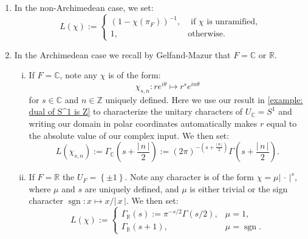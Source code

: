 \documentclass[11pt, x11names]{article}
\newcommand{\zz}{\mathbb{Z}}
\newcommand{\rr}{\mathbb{R}}
\newcommand{\cc}{\mathbb{C}}
\newcommand{\set}[1]{\left\{ #1 \right\}}
\renewcommand{\brack}[1]{\left(   #1 \right)}
\newcommand{\abs}[1]{\left| \, #1  \,\right|}
\DeclareMathOperator{\sgn}{sgn}
\newcommand{\inv}[1]{#1^{-1}}
\begin{document}
\begin{enumerate}[(1)]
    \item In the non-Archimedean case, we set:
    \begin{equation}
        \label{eqn: non-Arch local L-factor}
        L(\chi) := \begin{cases}
            \inv{\brack{1 - \chi(\pi_F)}}, & \text{ if } \chi \text{ is unramified,}\\
            1, & \text{otherwise}.
        \end{cases}
    \end{equation}
    \item In the Archimedean case we recall by Gelfand-Mazur that $F = \cc$ or $\rr$. 
    \begin{enumerate}[(i)]
        \item If $F = \cc$, note any $\chi$ is of the form:
        \begin{equation*}
            \chi_{s, n}: re^{i\theta} \mapsto r^s e^{i n \theta}
        \end{equation*}
         for $s \in \cc$ and $n \in \zz$ uniquely defined. Here we use our result in \ref{example: dual of S^1 is Z} to characterize the unitary characters of $U_\cc = S^1$ and writing our domain in polar coordinates automatically makes $r$ equal to the absolute value of our complex input. We then set:
         \begin{equation}
        \label{eqn: complex local L-factor}
            L(\chi_{s, n}) := \Gamma_\cc(s + \frac{\abs{n}}{2}) := \brack{2 \pi}^{-\brack{s + \frac{\abs{n}}{2}}}\Gamma(s + \frac{\abs{n}}{2}).
         \end{equation} 
         \item If $F = \rr$ the $U_F = \set{\pm 1}$. Note any character is of the form $\chi = \mu \abs{\cdot}^s$, where $\mu$ and $s$ are uniquely defined, and $\mu$ is either trivial or the sign character $\sgn: x \mapsto x/\abs{x}$. We then set:
         \begin{equation}
        \label{eqn: real local L-factor}
             L(\chi) := \begin{cases}
                 \Gamma_\rr(s) := \pi^{-s/2}\Gamma(s/2), & \mu = 1,\\
                 \Gamma_\rr(s+1), & \mu = \sgn.
             \end{cases}
         \end{equation}
    \end{enumerate}
\end{enumerate}
\end{document}
